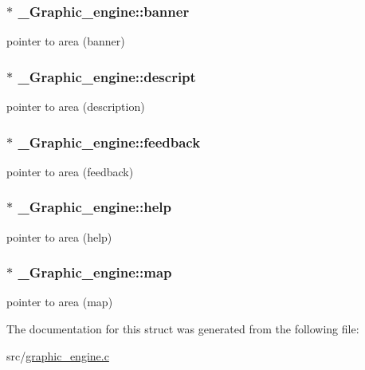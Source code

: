 \subsubsection[{\texorpdfstring{banner}{banner}}]{$\ast$ \+\_\+\+Graphic\+\_\+engine\+::banner}\hypertarget{struct__Graphic__engine_a440dfb2c23c3c4b7d3871187371117b9}{}\label{struct__Graphic__engine_a440dfb2c23c3c4b7d3871187371117b9}
pointer to area (banner) 
\subsubsection[{\texorpdfstring{descript}{descript}}]{$\ast$ \+\_\+\+Graphic\+\_\+engine\+::descript}\hypertarget{struct__Graphic__engine_a414bb888ecce3389c7ce348264758e58}{}\label{struct__Graphic__engine_a414bb888ecce3389c7ce348264758e58}
pointer to area (description) 
\subsubsection[{\texorpdfstring{feedback}{feedback}}]{$\ast$ \+\_\+\+Graphic\+\_\+engine\+::feedback}\hypertarget{struct__Graphic__engine_a4fc0ef353d000b20d57fb75d898c6d2d}{}\label{struct__Graphic__engine_a4fc0ef353d000b20d57fb75d898c6d2d}
pointer to area (feedback) 
\subsubsection[{\texorpdfstring{help}{help}}]{$\ast$ \+\_\+\+Graphic\+\_\+engine\+::help}\hypertarget{struct__Graphic__engine_ade1d3e95ad6def427f613a4a2d101875}{}\label{struct__Graphic__engine_ade1d3e95ad6def427f613a4a2d101875}
pointer to area (help) 
\subsubsection[{\texorpdfstring{map}{map}}]{$\ast$ \+\_\+\+Graphic\+\_\+engine\+::map}\hypertarget{struct__Graphic__engine_a1ea06bb881d335da8c31d63b3e834bdb}{}\label{struct__Graphic__engine_a1ea06bb881d335da8c31d63b3e834bdb}
pointer to area (map) 

The documentation for this struct was generated from the following file\+:\begin{DoxyCompactItemize}
\item 
src/\hyperlink{graphic__engine_8c}{graphic\+\_\+engine.\+c}\end{DoxyCompactItemize}
